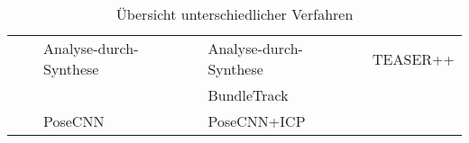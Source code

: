 \documentclass[a4paper, 11pt]{article}
\begin{document}
\begin{table}
\begin{tabular}{p{1.5cm}|l|l|l|l}
                                              &                                       & Analyse-durch-Synthese \cite{CategoryLevelObject} & Analyse-durch-Synthese \cite{CategoryLevelObject} & TEASER++\cite{Teaser++}                     \\
                                              &                                       &                                                   & BundleTrack\cite{BundleTrack}                     &                                             \\
                                              &                                       & PoseCNN\cite{PoseCNN}                             & PoseCNN\cite{PoseCNN}+ICP\cite{ICP}               &                                             \\
    \end{tabular}
    \caption{Übersicht unterschiedlicher Verfahren}
    \label{ubersicht}
\end{table}

\medskip

\printglossary[title=Glossar]

\printbibliography[title=Literatur]
\end{document}

